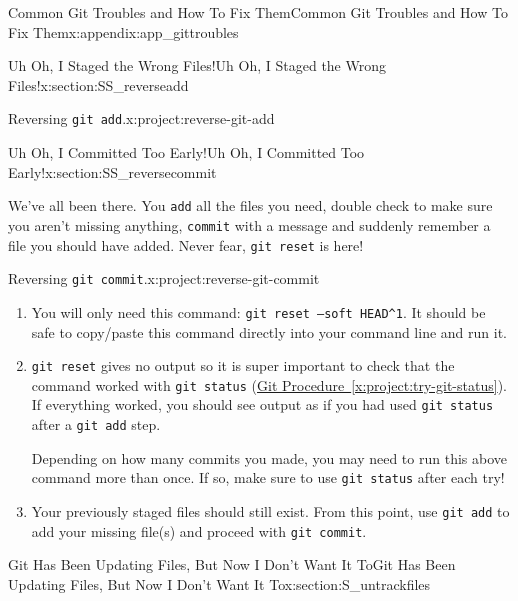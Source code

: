 \documentclass[oneside,10pt,]{book}
\newcommand{\xreffont}{\relax}
\newcommand{\mono}[1]{\texttt{#1}}
\begin{document}
\begin{appendixptx}{Common Git Troubles and How To Fix Them}{}{Common Git Troubles and How To Fix Them}{}{}{x:appendix:app_gittroubles}
\begin{sectionptx}{Uh Oh, I Staged the Wrong Files!}{}{Uh Oh, I Staged the Wrong Files!}{}{}{x:section:SS_reverseadd}
\begin{project}{Reversing \mono{git add}.}{x:project:reverse-git-add}
\end{project}%
\end{sectionptx}
%
%
\typeout{************************************************}
\typeout{************************************************}
%
\begin{sectionptx}{Uh Oh, I Committed Too Early!}{}{Uh Oh, I Committed Too Early!}{}{}{x:section:SS_reversecommit}
%
%
\begin{introduction}{}%
We've all been there. You \mono{add} all the files you need, double check to make sure you aren't missing anything, \mono{commit} with a message and suddenly remember a file you should have added. Never fear, \mono{git reset} is here!%
\end{introduction}%
\begin{project}{Reversing \mono{git commit}.}{x:project:reverse-git-commit}%
\begin{enumerate}[font=\bfseries,label=(\alph*),ref=\alph*]
\item{}You will only need this command: \mono{git reset --soft HEAD\textasciicircum{}1}. It should be safe to copy\slash{}paste this command directly into your command line and run it.%
\item{}\mono{git reset} gives no output so it is super important to check that the command worked with \mono{git status} (\hyperref[x:project:try-git-status]{Git Procedure~{\xreffont\ref{x:project:try-git-status}}}). If everything worked, you should see output as if you had used \mono{git status} after a \mono{git add} step.%
\par
Depending on how many commits you made, you may need to run this above command more than once. If so, make sure to use \mono{git status} after each try!%
\item{}Your previously staged files should still exist. From this point, use \mono{git add} to add your missing file(s) and proceed with \mono{git commit}.%
\end{enumerate}
\end{project}%
\end{sectionptx}
%
%
\typeout{************************************************}
\typeout{************************************************}
%
\begin{sectionptx}{Git Has Been Updating Files, But Now I Don't Want It To}{}{Git Has Been Updating Files, But Now I Don't Want It To}{}{}{x:section:S_untrackfiles}

\end{sectionptx}
\end{appendixptx}
\end{document}
